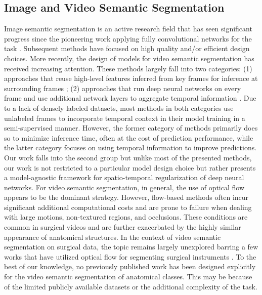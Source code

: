 \documentclass[twoside, print]{ieeecolor_arxiv}
\begin{document}
\subsection{Image and Video Semantic Segmentation}
Image semantic segmentation is an active research field that has seen significant progress since the pioneering work applying fully convolutional networks for the task \cite{long2015fully}. Subsequent methods have focused on high quality\cite{hq1}\cite{hq2}\cite{hq3}\cite{hq4}\cite{hq5}\cite{hq6} and/or efficient \cite{efficient1}\cite{efficient2}\cite{efficient3}\cite{efficient4} design choices. 
More recently, the design of models for video semantic segmentation has received increasing attention. These methods largely fall into two categories: (1) approaches that reuse high-level features inferred from key frames for inference at surrounding frames \cite{keyframe1}\cite{keyframe2}\cite{keyframe3}\cite{keyframe4}; (2) approaches that run deep neural networks on every frame and use additional network layers to aggregate temporal information\cite{temporallayer1}\cite{temporallayer2}\cite{temporallayer3} \cite{temporallayer4}\cite{noisylstm}
. Due to a lack of densely labeled datasets, most methods in both categories use unlabeled frames to incorporate temporal context in their model training in a semi-supervised manner. However, the former category of methods primarily does so to minimize inference time, often at the cost of prediction performance\cite{keyframe3}\cite{keyframe4}, while the latter category focuses on using temporal information to improve predictions.  Our work falls into the second group but unlike most of the presented methods, our work is not restricted to a particular model design choice but rather presents a model-agnostic framework for spatio-temporal regularization of deep neural networks. For video semantic segmentation, in general, the use of optical flow appears to be the dominant strategy. However, flow-based methods often incur significant additional computational costs and are prone to failure when dealing with large motions, non-textured regions, and occlusions. These conditions are common in surgical videos and are further exacerbated by the highly similar appearance of anatomical structures. In the context of video semantic segmentation on surgical data, the topic remains largely unexplored barring a few works that have utilized optical flow for segmenting surgical instruments \cite{surgeryinstrumentflow1}\cite{surgeryinstrumentflow2}. To the best of our knowledge, no previously published work has been designed explicitly for the video semantic segmentation of anatomical classes. This may be because of the limited publicly available datasets or the additional complexity of the task.
\end{document}
